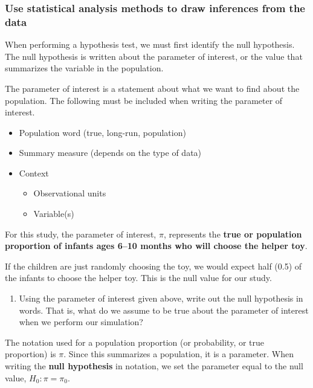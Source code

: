 \documentclass[
]{report}
\providecommand{\tightlist}{%
  \setlength{\itemsep}{0pt}\setlength{\parskip}{0pt}}
\begin{document}
\subsubsection*{Use statistical analysis methods to draw inferences from the data}\label{use-statistical-analysis-methods-to-draw-inferences-from-the-data}

When performing a hypothesis test, we must first identify the null hypothesis. The null hypothesis is written about the parameter of interest, or the value that summarizes the variable in the population.

The parameter of interest is a statement about what we want to find about the population. The following must be included when writing the parameter of interest.

\begin{itemize}
\item
  Population word (true, long-run, population)
\item
  Summary measure (depends on the type of data)
\item
  Context

  \begin{itemize}
  \item
    Observational units
  \item
    Variable(s)
  \end{itemize}
\end{itemize}

For this study, the parameter of interest, \(\pi\), represents the \textbf{true or population proportion of infants ages 6--10 months who will choose the helper toy}.

If the children are just randomly choosing the toy, we would expect half (0.5) of the infants to choose the helper toy. This is the null value for our study.

\begin{enumerate}
\def\labelenumi{\arabic{enumi}.}
\setcounter{enumi}{5}
\tightlist
\item
  Using the parameter of interest given above, write out the null hypothesis in words. That is, what do we assume to be true about the parameter of interest when we perform our simulation?
  \vspace{0.8in}
\end{enumerate}

The notation used for a population proportion (or probability, or true proportion) is \(\pi\). Since this summarizes a population, it is a parameter. When writing the \textbf{null hypothesis} in notation, we set the parameter equal to the null value, \(H_0: \pi = \pi_0\).
\end{document}
